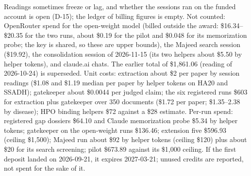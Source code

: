 \documentclass{article} %
\begin{document}
Readings sometimes freeze or lag, and whether the sessions ran on the funded account is open (D-15); the ledger of billing figures is empty. Not counted: OpenRouter spend for the open-weight model (billed outside the award: \$16.34--\$20.35 for the two runs, about \$0.19 for the pilot and \$0.048 for its memorization probe; the key is shared, so these are upper bounds), the Majeed search session (\$19.92), the consolidation session of 2026-11-15 (its two helpers about \$5.50 by helper tokens), and claude.ai chats. The earlier total of \$1,861.06 (reading of 2026-10-24) is superseded. Unit costs: extraction about \$2 per paper by session readings (\$1.08 and \$1.19 median per paper by helper tokens on HA20 and SSADH); gatekeeper about \$0.0044 per judged claim; the six registered runs \$603 for extraction plus gatekeeper over 350 documents (\$1.72 per paper; \$1.35--2.38 by disease); HPO binding helpers \$72 against a \$28 estimate. Per-run spend: registered gap dossiers \$64.10 and Claude memorization probe \$5.34 by helper tokens; gatekeeper on the open-weight runs \$136.46; extension five \$596.93 (ceiling \$1,500); Majeed run about \$92 by helper tokens (ceiling \$120) plus about \$20 for its search screening; pilot \$673.89 against its \$1,000 ceiling. If the first deposit landed on 2026-09-21, it expires 2027-03-21; unused credits are reported, not spent for the sake of it.

\FloatBarrier
\end{document}
